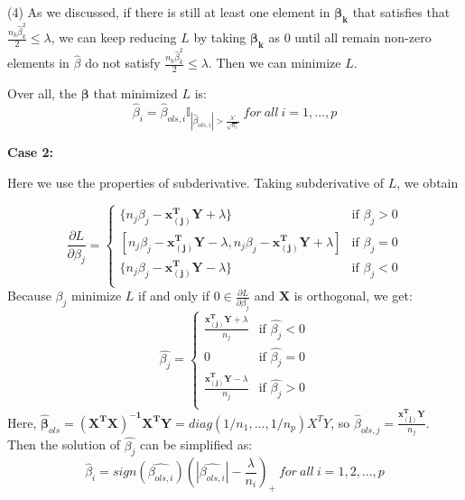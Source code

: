 \documentclass{article}
\begin{document}
\begin{appendices}
	(4) As we discussed, if there is still at least one element in $\bm{\beta_k}$ that satisfies that $\frac{n_k\hat{\beta}_k^2}{2}\leq\lambda$, we can keep reducing $L$ by taking $\bm{\beta_k}$ as 0 until all remain non-zero elements in $\hat{\beta}$ do not satisfy $\frac{n_k\hat{\beta}_k^2}{2}\leq\lambda$. Then we can minimize $L$.\par 
	Over all, the $\bm{\beta}$ that minimized $L$ is:
	\begin{equation*}
			\hat{\beta}_i = \hat{\beta}_{ols,i}\mathbb{I}_{|\hat{\beta}_{ols,i}|>\frac{\lambda'}{\sqrt{n_i}}}\ for\ all\ i=1,...,p
	\end{equation*}
	
\textbf{Case 2:}\par
Here we use the properties of subderivative. Taking subderivative of $L$, we obtain
	
\begin{equation*}
\frac{\partial L}{\partial \beta_j} = 
\begin{cases}
\{n_j\beta_j-\mathbf{x_{(j)}^TY}+\lambda\} &\mbox{if $\beta_j>0$}\\
 [n_j\beta_j-\mathbf{x_{(j)}^TY}-\lambda, n_j\beta_j-\mathbf{x_{(j)}^TY}+\lambda]&\mbox{if $\beta_j=0$}\\
\{n_j\beta_j-\mathbf{x_{(j)}^TY}-\lambda\} &\mbox{if $\beta_j<0$}\\
\end{cases}
\end{equation*}
Because $\beta_j$ minimize $L$ if and only if $0 \in \frac{\partial L}{\partial \beta_j}$ and  $\mathbf{X}$ is orthogonal, we get:
\begin{equation*}
\hat{\beta_j} = 
\begin{cases}
\frac{\mathbf{x_{(j)}^TY}+\lambda}{n_j}&\mbox{if $\hat{\beta_j}<0$}\\
0 &\mbox{if $\hat{\beta_j}=0$}\\
\frac{\mathbf{x_{(j)}^TY}-\lambda}{n_j}&\mbox{if $\hat{\beta_j}>0$}\\
\end{cases}
\end{equation*}
Here, $\bm{\hat{\beta}}_{ols} = \mathbf{(X^TX)^{-1}X^TY} = diag(1/n_1, ..., 1/n_p)X^TY$, so $\hat{\beta}_{ols,j}=\frac{\mathbf{x_{(j)}^TY}}{n_j}$. Then the solution of $\hat{\beta_j}$ can be simplified as:
\begin{equation*}
	\hat{\beta}_i = sign(\hat{\beta_{ols,i}})(|\hat{\beta_{ols,i}}|-\frac{\lambda}{n_i})_+\ for\ all\ i=1,2,...,p
\end{equation*}




\end{appendices}
\end{document}
